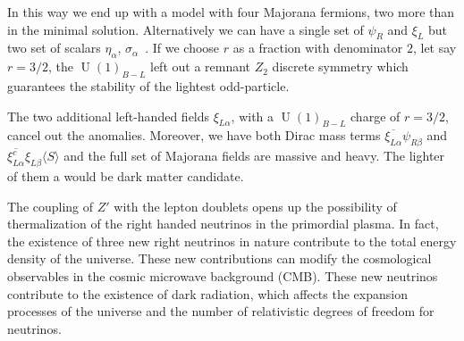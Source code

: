\documentclass[12pt]{article}
\begin{document}
In this way we end up with a model with four Majorana fermions, two more than in the minimal solution. Alternatively we can have a single set of $\psi_R$ and $\xi_L$ but two set of scalars $\eta_\alpha$, $\sigma_{\alpha}$~\cite{Reig:2018mdk}. If we choose $r$ as a fraction with denominator $2$, let say $r=3/2$, the $\operatorname{U}(1)_{B-L}$ left out a remnant $Z_2$ discrete symmetry which guarantees the stability of the lightest odd-particle.

The two additional left-handed fields $\xi_{L\alpha}$,  with a $\operatorname{U}(1)_{B-L}$ charge of $r=3/2$,  cancel out the anomalies. Moreover, we have both Dirac mass terms $\overline{\xi_{L \alpha}}\psi_{R \beta}$ and $ \overline{\xi_{L\alpha}^c }\xi_{L \beta} \langle S\rangle$ and the full set of Majorana fields are massive and heavy. The lighter of them a would be dark matter candidate.


The coupling of $Z'$ with the lepton doublets opens up the possibility
of thermalization of the right handed neutrinos in the primordial
plasma.
In fact, the existence of three new right neutrinos in nature
contribute to the total energy density of the universe. These new
contributions can modify the cosmological observables in the cosmic
microwave background (CMB). These new neutrinos contribute to the
existence of dark radiation, which affects the expansion processes of
the universe and the number of relativistic degrees of freedom for
neutrinos.
\end{document}
